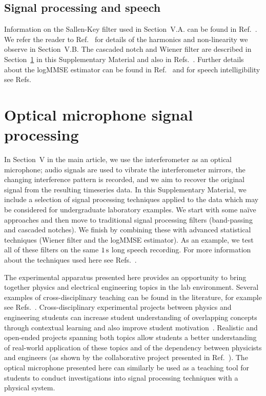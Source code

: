\documentclass[aps,pra,superscriptaddress,reprint]{revtex4-2}
\begin{document}
\subsection{Signal processing and speech}
Information on the Sallen-Key filter used in Section~V.A. can be found in Ref.~\cite{sallen_key_filter}. 
We refer the reader to Ref.~\cite{feynman} for details of the harmonics and non-linearity we observe in Section~V.B. 
The cascaded notch and Wiener filter are described in Section~\ref{sec:opmic} in this Supplementary Material and also in  Refs.~\cite{10.5555/541204,10.5555/151045}.
Further details about the logMMSE estimator can be found in Ref.~\cite{Ephraim1984SpeechEU_logMMSE} and for speech intelligibility see Refs.~\cite{speech_intelligibility,SubjectiveComparison}



\section{Optical microphone signal processing}
\label{sec:opmic}

In Section~V in the main article, we use the interferometer as an optical microphone; audio signals are used to vibrate the interferometer mirrors, the changing interference pattern is recorded, and we aim to recover the original signal from the resulting timeseries data.
In this Supplementary Material, we include a selection of signal processing techniques applied to the data which may be considered for undergraduate laboratory examples. 
We start with some na{\"i}ve approaches and then move to traditional signal processing filters (band-passing and cascaded notches). 
We finish by combining these with advanced statistical techniques (Wiener filter and the logMMSE estimator). 
As an example, we test all of these filters on the same $1\,{\rm s}$ long speech recording.
For more information about the techniques used here see Refs.~\cite{Mitra:2011, Lyons:2011, Stein:2000, OpenheimSchaferBuck:1999, PrakisManolakis:1996,10.5555/151045, DigitalProcingOfSpeechSignals:1978}.

The experimental apparatus presented here provides an opportunity to bring together physics and electrical engineering topics in the lab environment. 
Several examples of cross-disciplinary teaching can be found in the literature, for example see Refs.~\cite{OConnerSibrayForinash:2001, PiersonGurlandCrawford:2002, CafarelliEtAl:2012, MakanKopaszGingl:2014}. 
Cross-disciplinary experimental projects between physics and engineering students can increase student understanding of overlapping concepts through contextual learning and also improve student motivation~\cite{PiersonGurlandCrawford:2002}. 
Realistic and open-ended projects spanning both topics allow students a better understanding of real-world application of these topics and of the dependency between physicists and engineers (as shown by the collaborative project presented in Ref.~\cite{OConnerSibrayForinash:2001}).
The optical microphone presented here can similarly be used as a teaching tool for students to conduct investigations into signal processing techniques with a physical system. 
\end{document}
